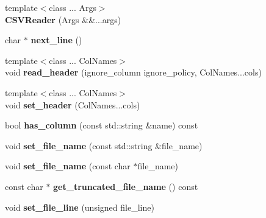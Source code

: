 \begin{DoxyCompactItemize}
\item 
\mbox{\label{classio_1_1_c_s_v_reader_a189debf95672e7cd7582e9f73d7203e5}} 
{\footnotesize template$<$class ... Args$>$ }\\{\bfseries C\+S\+V\+Reader} (Args \&\&...args)
\item 
\mbox{\label{classio_1_1_c_s_v_reader_a9fec7797cb27f64360cc48adc5f32c72}} 
char $\ast$ {\bfseries next\+\_\+line} ()
\item 
\mbox{\label{classio_1_1_c_s_v_reader_a9fad9ae02aa243dba6bc78156c5ce7e5}} 
{\footnotesize template$<$class ... Col\+Names$>$ }\\void {\bfseries read\+\_\+header} (ignore\+\_\+column ignore\+\_\+policy, Col\+Names...\+cols)
\item 
\mbox{\label{classio_1_1_c_s_v_reader_ab68eedff1bd59a49fa4ddb160dff94e0}} 
{\footnotesize template$<$class ... Col\+Names$>$ }\\void {\bfseries set\+\_\+header} (Col\+Names...\+cols)
\item 
\mbox{\label{classio_1_1_c_s_v_reader_aaba91fff6faea12e451943e8d32a5a17}} 
bool {\bfseries has\+\_\+column} (const std\+::string \&name) const
\item 
\mbox{\label{classio_1_1_c_s_v_reader_a4096c1e43a4fba2b4f5ae21d047b5fbc}} 
void {\bfseries set\+\_\+file\+\_\+name} (const std\+::string \&file\+\_\+name)
\item 
\mbox{\label{classio_1_1_c_s_v_reader_a5f1dc083a8fa8661f5ecdcf6aebc7b24}} 
void {\bfseries set\+\_\+file\+\_\+name} (const char $\ast$file\+\_\+name)
\item 
\mbox{\label{classio_1_1_c_s_v_reader_abc6321895152f5a34959b499da6512ee}} 
const char $\ast$ {\bfseries get\+\_\+truncated\+\_\+file\+\_\+name} () const
\item 
\mbox{\label{classio_1_1_c_s_v_reader_a1303bd6a2eb0d3d7c743212e52839ac4}} 
void {\bfseries set\+\_\+file\+\_\+line} (unsigned file\+\_\+line)

\end{DoxyCompactItemize}
